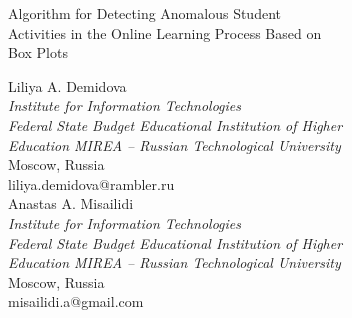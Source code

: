 \documentclass[letterpaper]{article}
\begin{document}
  \begin{Center}
    {\myfont Algorithm for Detecting Anomalous Student\\Activities in the Online Learning Process Based on\\Box Plots\\}
  \end{Center}
  \bigbreak
\begin{multicols}{2}
  \begin{justify}
    \begin{Center}
      \begin{small}
        Liliya A. Demidova\\
        \textit{
          Institute for Information Technologies\\
          Federal State Budget Educational Institution of Higher\\Education \guillemotleft MIREA – Russian Technological University\guillemotright\\
        }
        Moscow, Russia\\
        liliya.demidova@rambler.ru\\
        Anastas A. Misailidi\\
        \textit{
          Institute for Information Technologies\\
          Federal State Budget Educational Institution of Higher\\Education \guillemotleft MIREA – Russian Technological University\guillemotright\\
        }
        Moscow, Russia\\
        misailidi.a@gmail.com\\
      \end{small}
    \end{Center}
  \end{justify}
\end{multicols}
\bigbreak
\end{document}
